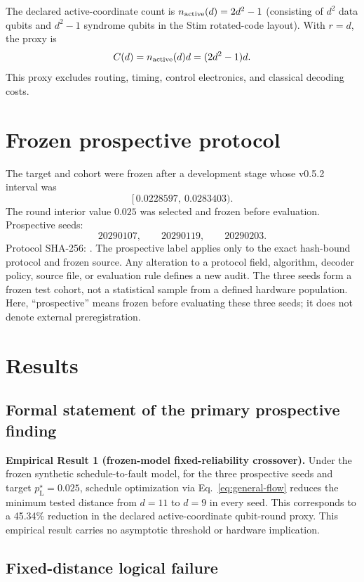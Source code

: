 \documentclass[11pt]{article}
\newcommand{\pL}{p_{\mathrm L}}
\begin{document}
The declared active-coordinate count is \(n_{\rm active}(d)=2d^2-1\) (consisting of \(d^2\) data qubits and \(d^2-1\) syndrome qubits in the Stim rotated-code layout). With \(r=d\), the proxy is
\begin{equation}
  C(d)=n_{\rm active}(d)d=(2d^2-1)d.
  \label{eq:resource}
\end{equation}
This proxy excludes routing, timing, control electronics, and classical decoding costs.

\section{Frozen prospective protocol}

The target and cohort were frozen after a development stage whose v0.5.2 interval was
\[
  [\,0.0228597,\ 0.0283403).
\]
The round interior value \(0.025\) was selected and frozen before evaluation. Prospective seeds:
\[
  20290107,\qquad20290119,\qquad20290203.
\]
\noindent Protocol SHA-256: . The prospective label applies only to the exact hash-bound protocol and frozen source. Any alteration to a protocol field, algorithm, decoder policy, source file, or evaluation rule defines a new audit. The three seeds form a frozen test cohort, not a statistical sample from a defined hardware population. Here, ``prospective'' means frozen before evaluating these three seeds; it does not denote external preregistration.

\section{Results}

\subsection{Formal statement of the primary prospective finding}

\textbf{Empirical Result 1 (frozen-model fixed-reliability crossover).} Under the frozen synthetic schedule-to-fault model, for the three prospective seeds and target \(\pL^\star=0.025\), schedule optimization via Eq.~\eqref{eq:general-flow} reduces the minimum tested distance from \(d=11\) to \(d=9\) in every seed. This corresponds to a 45.34\% reduction in the declared active-coordinate qubit-round proxy. This empirical result carries no asymptotic threshold or hardware implication.

\subsection{Fixed-distance logical failure}
\end{document}
